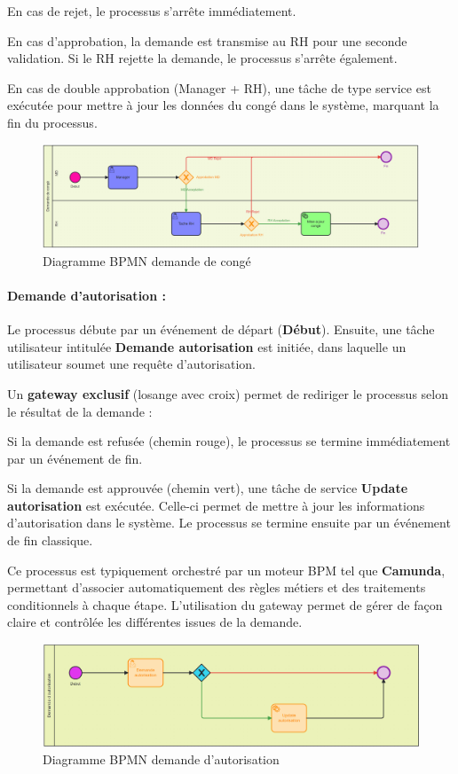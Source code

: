 En cas de rejet, le processus s’arrête immédiatement.

En cas d’approbation, la demande est transmise au RH pour une seconde validation. Si le RH rejette la demande, le processus s’arrête également.

En cas de double approbation (Manager + RH), une tâche de type service est exécutée pour mettre à jour les données du congé dans le système, marquant la fin du processus.
\newpage
\begin{figure}[h]
     \centering
     \includegraphics[width=17cm]{images/bpmn.png}
     \caption{Diagramme BPMN demande de congé}
     \label{fig:bpmnConge}
\end{figure}
\paragraph{Demande d’autorisation :}
Le processus débute par un événement de départ (\textbf{Début}).
Ensuite, une tâche utilisateur intitulée \textbf{Demande autorisation} est initiée, dans laquelle un utilisateur soumet une requête d'autorisation.

Un \textbf{gateway exclusif} (losange avec croix) permet de rediriger le processus selon le résultat de la demande :

Si la demande est refusée (chemin rouge), le processus se termine immédiatement par un événement de fin. 

Si la demande est approuvée (chemin vert), une tâche de service \textbf{Update autorisation} est exécutée.
Celle-ci permet de mettre à jour les informations d’autorisation dans le système.
Le processus se termine ensuite par un événement de fin classique.

Ce processus est typiquement orchestré par un moteur BPM tel que \textbf{Camunda}, permettant d’associer automatiquement des règles métiers et des traitements conditionnels à chaque étape. L'utilisation du gateway permet de gérer de façon claire et contrôlée les différentes issues de la demande.
\begin{figure}[h]
     \centering
     \includegraphics[width=17cm]{images/bpmn2.png}
     \caption{Diagramme BPMN demande d'autorisation}
     \label{fig:bpmnConge2}
\end{figure}
\newpage
